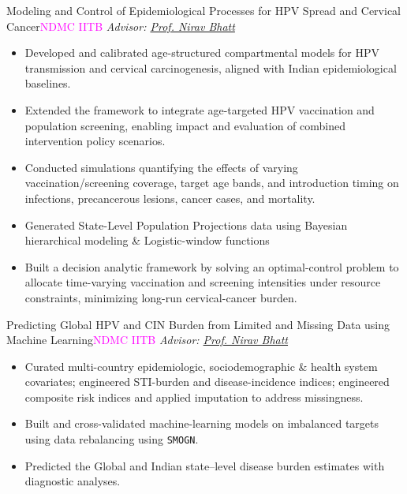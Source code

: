 
\begin{projects}

\project
  { Modeling and Control of Epidemiological Processes for HPV Spread and Cervical Cancer}{\textcolor{magenta}{NDMC IITB}}
  { \textit{Advisor: \href{https://www.iitmz.ac.in/schools/engineering-and-science/faculty/dr-nirav-bhatt}{Prof. Nirav Bhatt}} }
  {\begin{itemize}
  \setlength\itemsep{0.3em}
  \item Developed and calibrated age-structured compartmental models for HPV transmission and cervical carcinogenesis, aligned with Indian epidemiological baselines.
  \item Extended the framework to  integrate age-targeted HPV vaccination and population screening, enabling impact and evaluation of combined intervention policy scenarios.
  \item Conducted simulations quantifying the effects of varying vaccination/screening coverage, target age bands, and introduction timing on infections, precancerous lesions, cancer cases, and mortality.
  \item Generated State-Level Population Projections data using Bayesian hierarchical modeling \& Logistic-window functions 
  \item Built a decision analytic framework by solving an optimal-control problem to allocate time-varying vaccination and screening intensities under resource constraints, minimizing long-run cervical-cancer burden.
\end{itemize} }

\project
  {Predicting Global HPV and CIN Burden from Limited and Missing Data using Machine Learning}{\textcolor{magenta}{NDMC IITB}}
  { \textit{Advisor: \href{https://www.iitmz.ac.in/schools/engineering-and-science/faculty/dr-nirav-bhatt}{Prof. Nirav Bhatt}} }
  {\begin{itemize}
  \setlength\itemsep{0.3em}
  \item Curated multi-country epidemiologic,  sociodemographic \& health system covariates; engineered STI-burden and disease-incidence indices; engineered composite risk indices and applied imputation to address missingness.
  \item Built and cross-validated machine-learning models on imbalanced targets using data rebalancing using \texttt{SMOGN}.
  \item Predicted the Global and Indian state–level disease burden estimates with diagnostic analyses.
\end{itemize}}





\end{projects}
